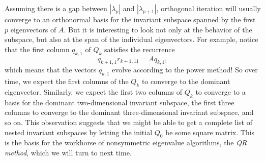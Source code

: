 \documentclass[12pt, leqno]{article} %
\begin{document}
Assuming there is a gap between $|\lambda_{p}|$ and $|\lambda_{p+1}|$,
orthogonal iteration will usually converge to an orthonormal basis
for the invariant subspace spanned by the first $p$ eigenvectors of $A$.
But it is interesting to look not only at the behavior of the subspace,
but also at the span of the individual eigenvectors.  For example,
notice that the first column $q_{k,1}$ of $Q_k$ satisfies the recurrence
\[
  q_{k+1,1} r_{k+1,11} = A q_{k,1},
\]
which means that the vectors $q_{k,1}$ evolve according to the power method!
So over time, we expect the first columns of the $Q_k$ to converge to the
dominant eigenvector.  Similarly, we expect the first two columns of $Q_k$
to converge to a basis for the dominant two-dimensional invariant subspace,
the first three columns to converge to the dominant three-dimensional
invariant subspace, and so on.  This observation suggests that we might be
able to get a complete list of nested invariant subspaces by letting the
initial $Q_0$ be some square matrix.  This is the basis for the workhorse
of nonsymmetric eigenvalue algorithms, the {\em QR method}, which we
will turn to next time.

%

%

%
\end{document}

